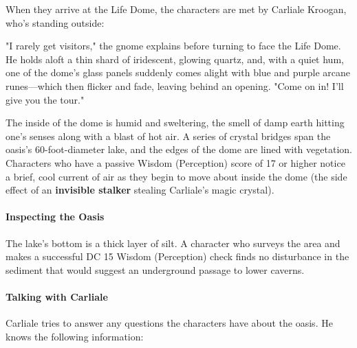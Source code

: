 \documentclass[a4paper, 11pt, bg=full, twocolumn, nooutline]{dndbook}
\begin{document}
When they arrive at the Life Dome, the characters are met by Carliale Kroogan, who's standing outside:

\begin{DndReadAloud}
"I rarely get visitors," the gnome explains before turning to face the Life Dome. He holds aloft a thin shard of iridescent, glowing quartz, and, with a quiet hum, one of the dome's glass panels suddenly comes alight with blue and purple arcane runes---which then flicker and fade, leaving behind an opening. "Come on in! I'll give you the tour."
\end{DndReadAloud}

The inside of the dome is humid and sweltering, the smell of damp earth hitting one's senses along with a blast of hot air. A series of crystal bridges span the oasis's 60-foot-diameter lake, and the edges of the dome are lined with vegetation. Characters who have a passive Wisdom (Perception) score of 17 or higher notice a brief, cool current of air as they begin to move about inside the dome (the side effect of an \textbf{invisible stalker} stealing Carliale's magic crystal).

\paragraph{Inspecting the Oasis}

The lake's bottom is a thick layer of silt. A character who surveys the area and makes a successful DC 15 Wisdom (Perception) check finds no disturbance in the sediment that would suggest an underground passage to lower caverns.

\paragraph{Talking with Carliale}

Carliale tries to answer any questions the characters have about the oasis. He knows the following information:
\end{document}
